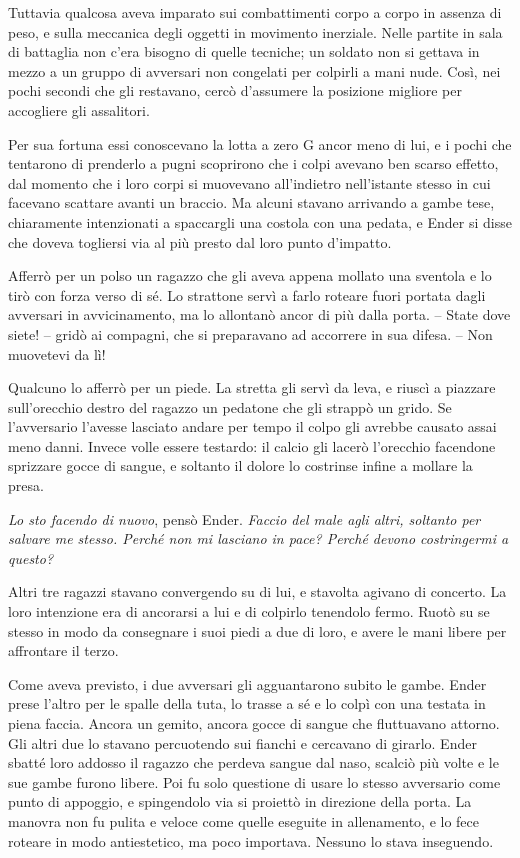 {Tuttavia qualcosa aveva imparato sui combattimenti corpo a corpo in
	assenza di peso, e sulla meccanica degli oggetti in movimento inerziale.
	Nelle partite in sala di battaglia non c'era bisogno di quelle tecniche;
	un soldato non si gettava in mezzo a un gruppo di avversari non
	congelati per colpirli a mani nude. Così, nei pochi secondi che gli
	restavano, cercò d'assumere la posizione migliore per accogliere gli
	assalitori.}

{Per sua fortuna essi conoscevano la lotta a zero G ancor meno di lui, e
	i pochi che tentarono di prenderlo a pugni scoprirono che i colpi
	avevano ben scarso effetto, dal momento che i loro corpi si muovevano
	all'indietro nell'istante stesso in cui facevano scattare avanti un
	braccio. Ma alcuni stavano arrivando a gambe tese, chiaramente
	intenzionati a spaccargli una costola con una pedata, e Ender si disse
	che doveva togliersi via al più presto dal loro punto d'impatto.}

{Afferrò per un polso un ragazzo che gli aveva appena mollato una
	sventola e lo tirò con forza verso di sé. Lo strattone servì a farlo
	roteare fuori portata dagli avversari in avvicinamento, ma lo allontanò
	ancor di più dalla porta. -- State dove siete! -- gridò ai compagni, che
	si preparavano ad accorrere in sua difesa. -- Non muovetevi da lì!}

{Qualcuno lo afferrò per un piede. La stretta gli servì da leva, e
	riuscì a piazzare sull'orecchio destro del ragazzo un pedatone che gli
	strappò un grido. Se l'avversario l'avesse lasciato andare per tempo il
	colpo gli avrebbe causato assai meno danni. Invece volle essere
	testardo: il calcio gli lacerò l'orecchio facendone sprizzare gocce di
	sangue, e soltanto il dolore lo costrinse infine a mollare la presa.}

\emph{{Lo sto facendo di nuovo}}{, \emph{} pensò Ender. \emph{Faccio del
		male agli altri, soltanto per salvare me stesso. Perché non mi lasciano
		in pace? Perché devono costringermi a questo?}}

{Altri tre ragazzi stavano convergendo su di lui, e stavolta agivano di
	concerto. La loro intenzione era di ancorarsi a lui e di colpirlo
	tenendolo fermo. Ruotò su se stesso in modo da consegnare i suoi piedi a
	due di loro, e avere le mani libere per affrontare il terzo.}

{Come aveva previsto, i due avversari gli agguantarono subito le gambe.
	Ender prese l'altro per le spalle della tuta, lo trasse a sé e lo colpì
	con una testata in piena faccia. Ancora un gemito, ancora gocce di
	sangue che fluttuavano attorno. Gli altri due lo stavano percuotendo sui
	fianchi e cercavano di girarlo. Ender sbatté loro addosso il ragazzo che
	perdeva sangue dal naso, scalciò più volte e le sue gambe furono libere.
	Poi fu solo questione di usare lo stesso avversario come punto di
	appoggio, e spingendolo via si proiettò in direzione della porta. La
	manovra non fu pulita e veloce come quelle eseguite in allenamento, e lo
	fece roteare in modo antiestetico, ma poco importava. Nessuno lo stava
	inseguendo.}

